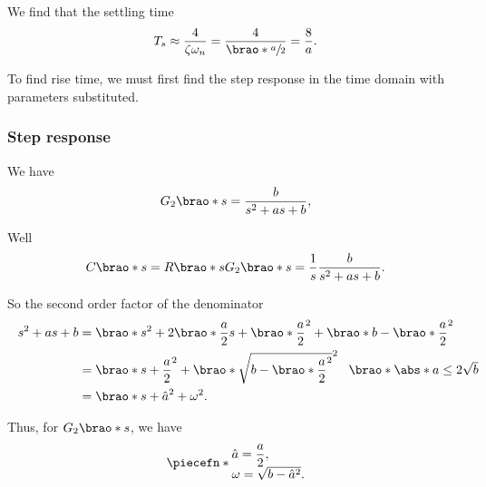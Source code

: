 \documentclass[12pt]{article}
\DeclarePairedDelimiter\brao()%
\DeclarePairedDelimiter\abs||
\DeclarePairedDelimiter\piecefn\{.
\begin{document}
\begin{enumerate}[(a)]
        We find that the settling time
        \begin{equation}\label{eq:settling time}
            T_s \approx \frac4{\zeta\omega_n} = \frac4{\brao*{\sfrac{a}2}} = \frac8a.
        \end{equation}

        To find rise time, we must first find the step response in the time domain with parameters substituted.

        \subsubsection{Step response}
        We have
        \[
            G_2\brao*s = \frac{b}{s^2 + as + b},
        \]

        Well
        \begin{equation}
            C\brao*s = R\brao*s G_2\brao*s = \frac1s \frac{b}{s^2 + as + b}.
        \end{equation}

        So the second order factor of the denominator
        \begin{equation}\label{eq:sum of squares}
            \begin{aligned}
                s^2 + as + b
                &{} = \brao*{s^2 + 2\brao*{\frac{a}2}s + \brao*{\frac{a}2}^2} + \brao*{b - \brao*{\frac{a}2}^2}
            \\*
                &{} = \brao*{s + \frac{a}2}^2 + \brao*{\sqrt{b - \brao*{\frac{a}2}^2}}^2
                \rlap{
                    $\hskip0.5em\brao*{\abs*{a} \leq 2\sqrt{b}}$
                }
            \\*
                &{}= \brao*{s + \hat{a}}^2 + \omega^2.
            \\*
            \end{aligned}
        \end{equation}

        Thus, for $G_2\brao*s$, we have
        \begin{equation}
            \piecefn*{
                \begin{array}{@{}l@{}}
                    \displaystyle
                    \hat{a} = \frac{a}2, \\*
                    \omega = \sqrt{b - \hat{a}^2}. \\*
                \end{array}
            }
        \end{equation}


\end{enumerate}
\end{document}
